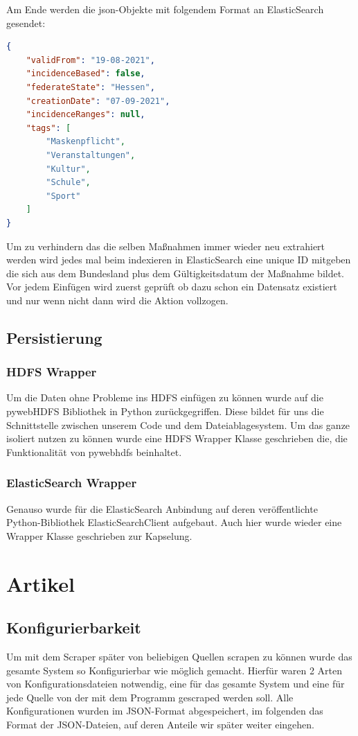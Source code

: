 \documentclass[12pt,oneside,a4paper,parskip]{scrbook}
\begin{document}
Am Ende werden die json-Objekte mit folgendem Format an ElasticSearch gesendet:

\begin{lstlisting}[caption=Metadaten-Objekt, language=json]
{
	"validFrom": "19-08-2021",
	"incidenceBased": false,
	"federateState": "Hessen",
	"creationDate": "07-09-2021",
	"incidenceRanges": null,
	"tags": [
		"Maskenpflicht",
		"Veranstaltungen",
		"Kultur",
		"Schule",
		"Sport"
	]
}
\end{lstlisting}

Um zu verhindern das die selben Maßnahmen immer wieder neu extrahiert werden wird jedes mal beim indexieren in ElasticSearch eine unique ID mitgeben die sich aus dem Bundesland plus dem Gültigkeitsdatum der Maßnahme bildet. Vor jedem Einfügen wird zuerst geprüft ob dazu schon ein Datensatz existiert und nur wenn nicht dann wird die Aktion vollzogen.

\subsection{Persistierung}

\subsubsection{HDFS Wrapper}

Um die Daten ohne Probleme ins HDFS einfügen zu können wurde auf die pywebHDFS Bibliothek in Python zurückgegriffen. Diese bildet für uns die Schnittstelle zwischen unserem Code und dem Dateiablagesystem. Um das ganze isoliert nutzen zu können wurde eine HDFS Wrapper Klasse geschrieben die, die Funktionalität von pywebhdfs beinhaltet.

\subsubsection{ElasticSearch Wrapper}

Genauso wurde für die ElasticSearch Anbindung auf deren veröffentlichte Python-Bibliothek ElasticSearchClient aufgebaut. Auch hier wurde wieder eine Wrapper Klasse geschrieben zur Kapselung.

\section{Artikel}
\subsection{Konfigurierbarkeit}
Um mit dem Scraper später von beliebigen Quellen scrapen zu können wurde das gesamte System so Konfigurierbar wie möglich gemacht. Hierfür waren 2 Arten von Konfigurationsdateien notwendig, eine für das gesamte System und eine für jede Quelle von der mit dem Programm gescraped werden soll. Alle Konfigurationen wurden im JSON-Format abgespeichert, im folgenden das Format der JSON-Dateien, auf deren Anteile wir später weiter eingehen.
\end{document}
